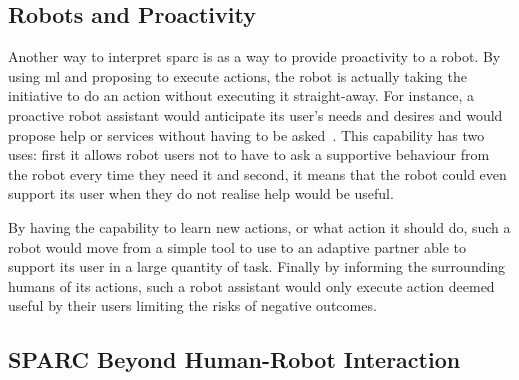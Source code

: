 

\subsection{Robots and Proactivity}
Another way to interpret \gls{sparc} is as a way to provide proactivity to a robot. By using \gls{ml} and proposing to execute actions, the robot is actually taking the initiative to do an action without executing it straight-away. For instance, a proactive robot assistant would anticipate its user's needs and desires and would propose help or services without having to be asked~\citep{mason2011robot}. This capability has two uses: first it allows robot users not to have to ask a supportive behaviour from the robot every time they need it and second, it means that the robot could even support its user when they do not realise help would be useful.

By having the capability to learn new actions, or what action it should do, such a robot would move from a simple tool to use to an adaptive partner able to support its user in a large quantity of task. Finally by informing the surrounding humans of its actions, such a robot assistant would only execute action deemed useful by their users limiting the risks of negative outcomes.

\subsection{SPARC Beyond Human-Robot Interaction}\label{sec:disc_beyond}

